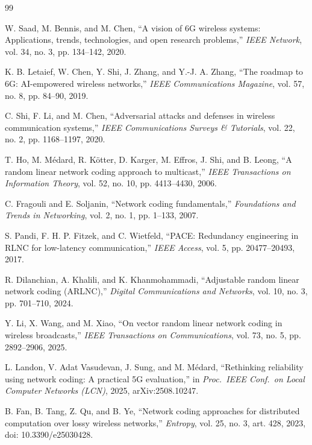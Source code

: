\documentclass[journal]{IEEEtran}
\begin{document}
\begin{thebibliography}{99}

 W. Saad, M. Bennis, and M. Chen, ``A vision of 6G wireless systems: Applications, trends, technologies, and open research problems,'' \textit{IEEE Network}, vol. 34, no. 3, pp. 134--142, 2020.

 K. B. Letaief, W. Chen, Y. Shi, J. Zhang, and Y.-J. A. Zhang, ``The roadmap to 6G: AI-empowered wireless networks,'' \textit{IEEE Communications Magazine}, vol. 57, no. 8, pp. 84--90, 2019.

 C. Shi, F. Li, and M. Chen, ``Adversarial attacks and defenses in wireless communication systems,'' \textit{IEEE Communications Surveys \& Tutorials}, vol. 22, no. 2, pp. 1168--1197, 2020.

 T. Ho, M. M\'edard, R. K\"otter, D. Karger, M. Effros, J. Shi, and B. Leong, ``A random linear network coding approach to multicast,'' \textit{IEEE Transactions on Information Theory}, vol. 52, no. 10, pp. 4413--4430, 2006.

 C. Fragouli and E. Soljanin, ``Network coding fundamentals,'' \textit{Foundations and Trends in Networking}, vol. 2, no. 1, pp. 1--133, 2007.

 S. Pandi, F. H. P. Fitzek, and C. Wietfeld, ``PACE: Redundancy engineering in RLNC for low-latency communication,'' \textit{IEEE Access}, vol. 5, pp. 20477--20493, 2017.

 R. Dilanchian, A. Khalili, and K. Khanmohammadi, ``Adjustable random linear network coding (ARLNC),'' \textit{Digital Communications and Networks}, vol. 10, no. 3, pp. 701--710, 2024.

 Y. Li, X. Wang, and M. Xiao, ``On vector random linear network coding in wireless broadcasts,'' \textit{IEEE Transactions on Communications}, vol. 73, no. 5, pp. 2892--2906, 2025.

 L. Landon, V. Adat Vasudevan, J. Sung, and M. M\'edard, ``Rethinking reliability using network coding: A practical 5G evaluation,'' in \textit{Proc.\ IEEE Conf.\ on Local Computer Networks (LCN)}, 2025, arXiv:2508.10247.

 B. Fan, B. Tang, Z. Qu, and B. Ye, ``Network coding approaches for distributed computation over lossy wireless networks,'' \textit{Entropy}, vol. 25, no. 3, art. 428, 2023, doi: 10.3390/e25030428.


\end{thebibliography}
\end{document}
